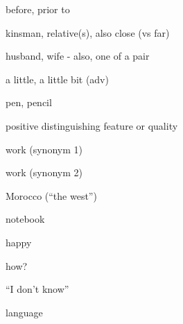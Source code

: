 \documentclass[avery5371,grid,frame]{flashcards}
\begin{document}
\begin{flashcard}{\LARGE before, prior to}
\LARGE {}
\end{flashcard}
\begin{flashcard}{\LARGE kinsman, relative(s), also close (vs far)}
\LARGE {}
\end{flashcard}
\begin{flashcard}{\LARGE husband, wife - also, one of a pair}
\LARGE {}
\end{flashcard}
\begin{flashcard}{\LARGE a little, a little bit (adv)}
\LARGE {}
\end{flashcard}
\begin{flashcard}{\LARGE pen, pencil}
\LARGE {}
\end{flashcard}
\begin{flashcard}{\LARGE positive distinguishing feature or quality}
\LARGE {}
\end{flashcard}
\begin{flashcard}{\LARGE work (synonym 1)}
\LARGE {}
\end{flashcard}
\begin{flashcard}{\LARGE work (synonym 2)}
\LARGE {}
\end{flashcard}
\begin{flashcard}{\LARGE Morocco (``the west'')}
\LARGE {}
\end{flashcard}
\begin{flashcard}{\LARGE notebook}
\LARGE {}
\end{flashcard}
\begin{flashcard}{\LARGE happy}
\LARGE {}
\end{flashcard}
\begin{flashcard}{\LARGE how?}
\LARGE {}
\end{flashcard}
\begin{flashcard}{\LARGE ``I don't know''}
\LARGE {}
\end{flashcard}
\begin{flashcard}{\LARGE language}
\LARGE {}
\end{flashcard}
\end{document}
